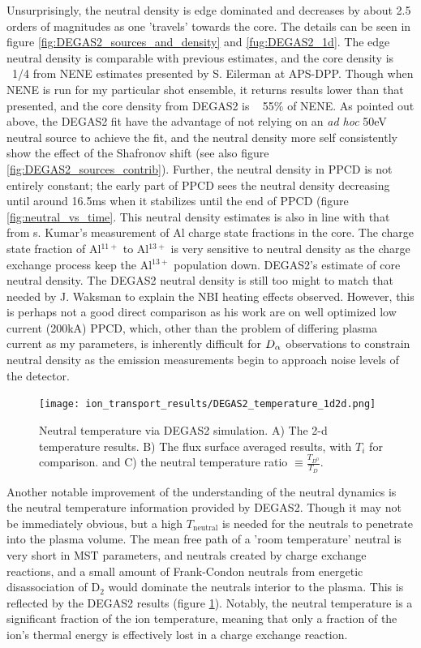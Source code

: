Unsurprisingly, the neutral density is edge dominated and decreases by about 2.5 orders of magnitudes as one 'travels' towards the core. The details can be seen in figure \ref{fig:DEGAS2_sources_and_density} and \ref{fug:DEGAS2_1d}. The edge neutral density is comparable with previous estimates, and the core density is ~1/4 from NENE estimates presented by S. Eilerman at APS-DPP\cite{Eilerman2010}. Though when NENE is run for my particular shot ensemble, it returns results lower than that presented, and the core density from DEGAS2 is ~ 55\% of NENE. As pointed out above, the DEGAS2 fit have the advantage of not relying on an \textit{ad hoc} 50eV neutral source to achieve the fit, and the neutral density more self consistently show the effect of the Shafronov shift (see also figure \ref{fig:DEGAS2_sources_contrib}). Further, the neutral density in PPCD is not entirely constant; the early part of PPCD sees the neutral density decreasing until around 16.5ms when it stabilizes until the end of PPCD (figure \ref{fig:neutral_vs_time}. This neutral density estimates is also in line with that from s. Kumar's measurement of Al charge state fractions in the core. The charge state fraction of Al$^{11+}$ to Al$^{13+}$ is very sensitive to neutral density as the charge exchange process keep the Al$^{13+}$ population down. DEGAS2's estimate of core neutral density. The DEGAS2 neutral density is still too might to match that needed by J. Waksman to explain the NBI heating effects observed. However, this is perhaps not a good direct comparison as his work are on well optimized low current (200kA) PPCD, which, other than the problem of differing plasma current as my parameters, is inherently difficult for $D_{\alpha}$ observations to constrain neutral density as the emission measurements begin to approach noise levels of the detector. 

\begin{figure}
    \centering
    \texttt{[image: ion\_transport\_results/DEGAS2\_temperature\_1d2d.png]}
    \caption[Neutral temperature via DEGAS2]{Neutral temperature via DEGAS2 simulation. A) The 2-d temperature results. B) The flux surface averaged results, with $T_i$ for comparison. and C) the neutral temperature ratio $\equiv \frac{T_{D^0}}{T_D}$.}
    \label{fig:DEGAS2_temperature}
\end{figure}

Another notable improvement of the understanding of the neutral dynamics is the neutral temperature information provided by DEGAS2. Though it may not be immediately obvious, but a high $T_{\text{neutral}}$ is needed for the neutrals to penetrate into the plasma volume. The mean free path of a 'room temperature' neutral is very short in MST parameters, and neutrals created by charge exchange reactions, and a small amount of Frank-Condon neutrals from energetic disassociation of D$_2$ would dominate the neutrals interior to the plasma. This is reflected by the DEGAS2 results (figure \ref{fig:DEGAS2_temperature}). Notably, the neutral temperature is a significant fraction of the ion temperature, meaning that only a fraction of the ion's thermal energy is effectively lost in a charge exchange reaction.

